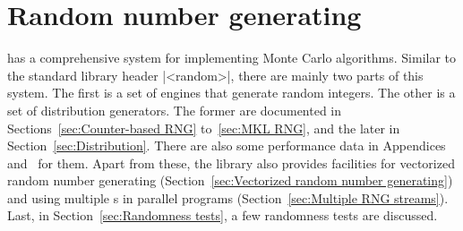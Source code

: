 %
%
%
%

\chapter{Random number generating}
\label{chap:Random number generating}

\mckl has a comprehensive \rng system for implementing Monte Carlo algorithms.
Similar to the standard library header |<random>|, there are mainly two parts
of this system. The first is a set of \rng{} engines that generate random
integers. The other is a set of distribution generators. The former are
documented in Sections~\ref{sec:Counter-based RNG} to~\ref{sec:MKL RNG}, and
the later in Section~\ref{sec:Distribution}. There are also some performance
data in Appendices~
and~ for them. Apart from these, the
library also provides facilities for vectorized random number generating
(Section~\ref{sec:Vectorized random number generating}) and using multiple
\rng{}s in parallel programs (Section~\ref{sec:Multiple RNG streams}). Last, in
Section~\ref{sec:Randomness tests}, a few randomness tests are discussed.

